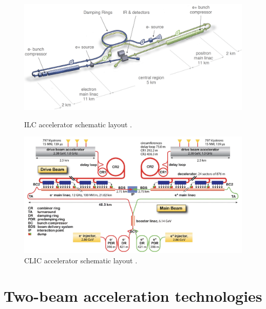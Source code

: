 \begin{figure}[!h]
\includegraphics[width=140mm, keepaspectratio]{pictures/ILC}
\caption{ILC accelerator schematic layout \cite{ILC:cdr}.}
\label{fig:ILC_schematic}

\vspace{5mm}
\centering
\includegraphics[width=140mm, keepaspectratio]{pictures/CLIC}
\caption{CLIC accelerator schematic layout \cite{CLIC:cdr}.}
\label{fig:CLIC_schematic}




\end{figure}


\newpage
\section[Two-beam acceleration technologies]{Two-beam acceleration technologies}\label{sec:two_beam_tech}

